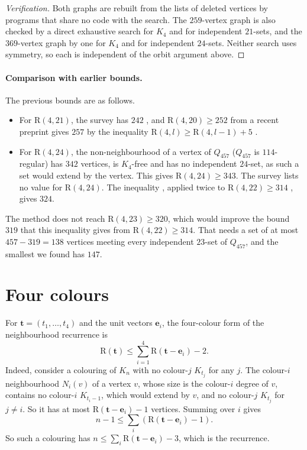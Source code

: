 \documentclass[11pt]{article}
\theoremstyle{spacedplain}
\theoremstyle{spaceddef}
\theoremstyle{spacedremark}
\newcommand{\R}{\mathrm{R}}
\newcommand{\bt}{\mathbf{t}}
\newcommand{\e}{\mathbf{e}}
\begin{document}
\begin{proof}[Verification]
Both graphs are rebuilt from the lists of deleted vertices by programs that share no code with the search.
The $259$-vertex graph is also checked by a direct exhaustive search for $K_4$ and for independent $21$-sets, and the $369$-vertex graph by one for $K_4$ and for independent $24$-sets.
Neither search uses symmetry, so each is independent of the orbit argument above.
\end{proof}

\paragraph{Comparison with earlier bounds.}
The previous bounds are as follows.
\begin{itemize}
\item For $\R(4,21)$, the survey has $242$ \cite{SLZL}, and $\R(4,20)\ge 252$ from a recent preprint \cite{Yu26} gives $257$ by the inequality $\R(4,l)\ge\R(4,l-1)+5$ \cite[2.3(e)]{Rad26}.
\item For $\R(4,24)$, the non-neighbourhood of a vertex of $Q_{457}$ ($Q_{457}$ is $114$-regular) has $342$ vertices, is $K_4$-free and has no independent $24$-set, as such a set would extend by the vertex.
This gives $\R(4,24)\ge 343$.
The survey lists no value for $\R(4,24)$.
The inequality \cite[2.3(e)]{Rad26}, applied twice to $\R(4,22)\ge 314$ \cite{LinCa}, gives $324$.
\end{itemize}

The method does not reach $\R(4,23)\ge 320$, which would improve the bound $319$ that this inequality gives from $\R(4,22)\ge 314$.
That needs a set of at most $457-319=138$ vertices meeting every independent $23$-set of $Q_{457}$, and the smallest we found has $147$.

\section{Four colours}\label{sec:four}

For $\bt=(t_1,\dots,t_4)$ and the unit vectors $\e_i$, the four-colour form of the neighbourhood recurrence \cite[6.1(a)]{Rad26} is
\[
\R(\bt)\le\sum_{i=1}^4\R(\bt-\e_i)-2 .
\]
Indeed, consider a colouring of $K_n$ with no colour-$j$ $K_{t_j}$ for any $j$.
The colour-$i$ neighbourhood $N_i(v)$ of a vertex $v$, whose size is the colour-$i$ degree of $v$, contains no colour-$i$ $K_{t_i-1}$, which would extend by $v$, and no colour-$j$ $K_{t_j}$ for $j\ne i$.
So it has at most $\R(\bt-\e_i)-1$ vertices.
Summing over $i$ gives
\[
n-1\le\sum_i(\R(\bt-\e_i)-1) .
\]
So such a colouring has $n\le\sum_i\R(\bt-\e_i)-3$, which is the recurrence.
\end{document}
